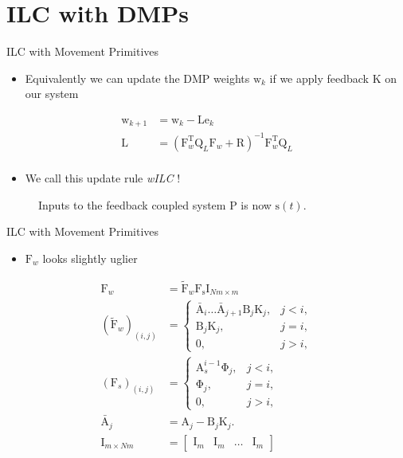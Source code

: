 \documentclass[handout]{beamer}
\newcommand{\boldvec}[1]{\boldsymbol{\mathrm{#1}}}
\let\vec\boldvec
\newcommand{\dmp}{\vec{s}} %
\newcommand{\error}{\vec{e}} %
\newcommand{\weights}{\vec{w}} %
\newcommand{\basis}{\vec{\Phi}} %
\newcommand{\lmatrix}{\vec{L}} %
\newcommand{\alg}{\emph{wILC }}
\begin{document}
\section{ILC with DMPs}
%
\begin{frame}{ILC with Movement Primitives}
\begin{itemize}
\item Equivalently we can update the DMP weights $\weights_k$ if we apply feedback $\vec{K}$ on our system
\end{itemize}
\begin{equation*}
\begin{aligned}
\weights_{k+1} &= \weights_{k} - \lmatrix\error_{k} \\
\lmatrix &= (\vec{F}_{w}^{\mathrm{T}}\vec{Q}_L\vec{F}_w + \vec{R})^{-1}\vec{F}_w^{\mathrm{T}}\vec{Q}_L \\
\end{aligned}
\end{equation*}
\begin{itemize}
\item We call this update rule \alg!
\end{itemize}
\begin{figure}
\centering
\def\svgwidth{200pt}

\caption{Inputs to the feedback coupled system $\vec{P}$ is now $\dmp(t)$.}
\end{figure}
\end{frame}
%
\begin{frame}{ILC with Movement Primitives}
\begin{itemize}
\item $\vec{F}_w$ looks slightly uglier
\end{itemize}
\begin{equation*}
\begin{aligned}
\vec{F}_{w} &= \tilde{\vec{F}}_{w}\vec{F}_{\dmp}\vec{I}_{Nm \times m} \\
(\tilde{\vec{F}}_{w})_{(i,j)} &= \left \{
\begin{array}{cc}
\bar{\vec{A}}_{i}\ldots \bar{\vec{A}}_{j+1}\vec{B}_{j}\vec{K}_{j}, & j < i, \\ 
\vec{B}_{j}\vec{K}_{j}, & j = i, \\
\vec{0}, & j > i,  
\end{array} \right. \\
(\vec{F}_{s})_{(i,j)} &= \left \{
\begin{array}{cc}
\vec{A}_s^{i-1}\basis_{j}, & j < i, \\ 
\basis_{j}, & j = i, \\
\vec{0}, & j > i,  
\end{array} \right. \\
\bar{\vec{A}}_j &= \vec{A}_j - \vec{B}_j\vec{K}_j. \\
\vec{I}_{m\times Nm} &= \begin{bmatrix}
  \vec{I}_{m} & \vec{I}_{m} & \ldots & \vec{I}_{m}
 \end{bmatrix}
\end{aligned}
\end{equation*}

\end{frame}
%
\end{document}
